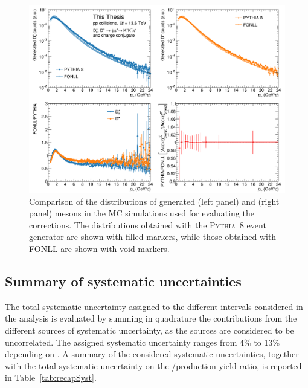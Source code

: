 \begin{figure}[tb]
    \begin{center}
    \includegraphics[width=\textwidth]{Figures/Chapter 6/PtShape.png}
    \caption{Comparison of the \pt distributions of generated \ds (left panel) and \dpl (right panel) mesons in the MC simulations used for evaluating the \aeff corrections. The distributions obtained with the \textsc{Pythia~8} event generator are shown with filled markers, while those obtained with FONLL are shown with void markers.} 
    \label{fig:MCptshape} 
    \end{center}
\end{figure}

\subsection{Summary of systematic uncertainties}
The total systematic uncertainty assigned to the different \pt intervals considered in the analysis is evaluated by summing in quadrature the contributions from the different sources of systematic uncertainty, as the sources are considered to be uncorrelated. The assigned systematic uncertainty ranges from 4\% to 13\% depending on \pt. A summary of the considered systematic uncertainties, together with the total systematic uncertainty on the \ds/\dpl production yield ratio, is reported in Table~\ref{tab:recapSyst}.

